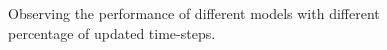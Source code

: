 

\begin{figure}[t]
    \vspace{-5pt}
    \caption{Observing the performance of different models with different percentage of updated time-steps.}
    \label{fig:lambda}
    \vspace{-10pt}
\end{figure}